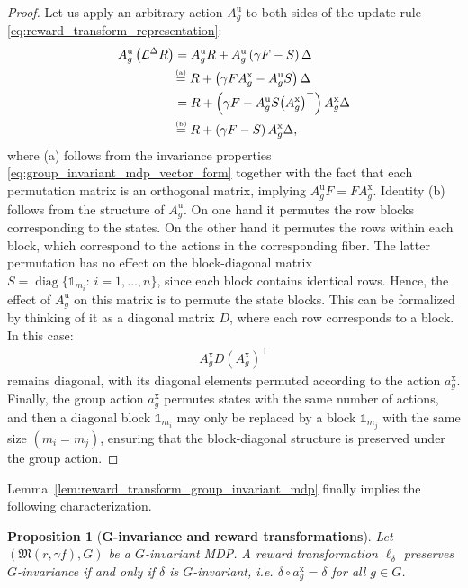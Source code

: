 \documentclass[10pt,leqno]{amsart}
\DeclareMathOperator{\diag}{diag}
\newcommand{\stkrl}[2]{\stackrel{\text{\tiny{(#1)}}}{#2}}
\newcommand{\repr}[1]{a^{#1}}
\newcommand{\reprarg}[2]{\repr{#1}_{#2}}
\newcommand{\cost}{r}
\newcommand{\Cost}{R}
\newcommand{\f}{f}
\newcommand{\F}{F}
\newcommand{\disc}{\gamma}
\newcommand{\Proj}{S}
\newcommand{\Projexpl}{\diag\{\mathds{1}_{m_i} \!:\, i = 1, \ldots, n\}}
\newcommand{\actAdvsym}{\ell}
\newcommand{\actAdv}[1]{\actAdvsym_{#1}}
\newcommand{\mdp}{\mathfrak{M}}
\newcommand{\mdparg}[2]{\mdp\left(#1, #2\right)}
\newtheorem{proposition}[theorem]{Proposition}
\begin{document}
\begin{proof}
    Let us apply an arbitrary action $A_g^{\mathrm{u}}$ to both sides of the update rule \eqref{eq:reward_transform_representation}:
    \begin{align*}
        A_g^{\mathrm{u}} \left( \mathcal{L}^\Delta \Cost\right) &= A_g^{\mathrm{u}} \Cost + A_g^{\mathrm{u}}\left( \disc \F - \Proj \right) \Delta\\
        &\!\stkrl{a}{=} \Cost + \left( \disc \F A_g^{\mathrm{x}} - A_g^{\mathrm{u}}\Proj \right) \Delta\\
        &= \Cost + \left( \disc \F - A_g^{\mathrm{u}}\Proj\bigl(A_g^{\mathrm{x}}\bigr)^{\top} \right) A_g^{\mathrm{x}} \Delta\\
        &\!\stkrl{b}{=} \Cost + \left( \disc \F - \Proj \right) A_g^{\mathrm{x}} \Delta,
    \end{align*}
    where (a) follows from the invariance properties \eqref{eq:group_invariant_mdp_vector_form} together with the fact that each permutation matrix is an orthogonal matrix, implying $A_g^{\mathrm{u}} \F = \F A_g^{\mathrm{x}}$. Identity (b) follows from the structure of $A_g^{\mathrm{u}}$. On one hand it permutes the row blocks corresponding to the states. On the other hand it permutes the rows within each block, which correspond to the actions in the corresponding fiber. The latter permutation has no effect on the block-diagonal matrix $\Proj = \Projexpl$, since each block contains identical rows. Hence, the effect of $A_g^{\mathrm{u}}$ on this matrix is to permute the state blocks. This can be formalized by thinking of it as a diagonal matrix $D$, where each row corresponds to a block. In this case:
    \begin{align*}
        A_g^{\mathrm{x}} D (A_g^{\mathrm{x}})^\top
    \end{align*}
    remains diagonal, with its diagonal elements permuted according to the action $\reprarg{\mathrm{x}}{g}$. Finally, the group action $\reprarg{\mathrm{x}}{g}$ permutes states with the same number of actions, and then a diagonal block $\mathds{1}_{m_i}$ may only be replaced by a block $\mathds{1}_{m_j}$ with the same size $(m_i = m_j)$, ensuring that the block-diagonal structure is preserved under the group action.
\end{proof}
\noindent
Lemma~\ref{lem:reward_transform_group_invariant_mdp} finally implies the following characterization.
\begin{proposition}[\textbf{$\boldsymbol{G}$-invariance and reward transformations}]\label{prop:g_invariance}
    Let $(\mdparg{\cost}{\disc \f}, G)$ be a $G$-invariant MDP. A reward transformation $\actAdv{\delta}$ preserves $G$-invariance if and only if $\delta$ is $G$-invariant, i.e. $\delta \circ \reprarg{\mathrm{x}}{g} = \delta$ for all $g \in G$.
\end{proposition}
\end{document}
